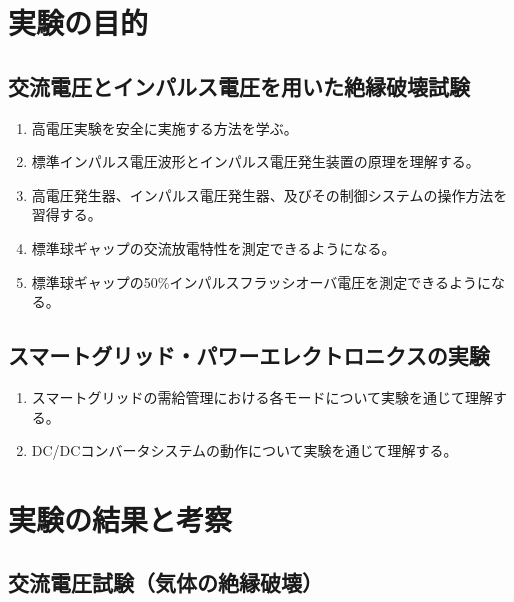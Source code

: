\documentclass[a4paper,11pt,xelatex,ja=standard]{bxjsarticle}
\begin{document}
\section{実験の目的}
    \subsection{交流電圧とインパルス電圧を用いた絶縁破壊試験}
        \begin{enumerate}
            \item 高電圧実験を安全に実施する方法を学ぶ。
            \item 標準インパルス電圧波形とインパルス電圧発生装置の原理を理解する。
            \item 高電圧発生器、インパルス電圧発生器、及びその制御システムの操作方法を習得する。
            \item 標準球ギャップの交流放電特性を測定できるようになる。
            \item 標準球ギャップの50\%インパルスフラッシオーバ電圧を測定できるようになる。
        \end{enumerate}

    \subsection{スマートグリッド・パワーエレクトロニクスの実験}
        \begin{enumerate}
            \item スマートグリッドの需給管理における各モードについて実験を通じて理解する。
            \item DC/DCコンバータシステムの動作について実験を通じて理解する。
        \end{enumerate}

\section{実験の結果と考察}
        \subsection{交流電圧試験（気体の絶縁破壊）}
\end{document}
